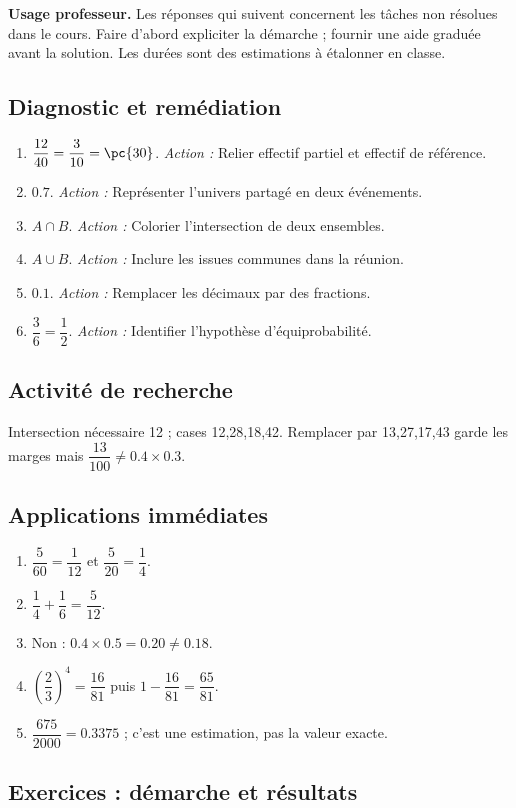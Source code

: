 \label{C05-CORR}
\textbf{Usage professeur.} Les réponses qui suivent concernent les tâches non résolues dans le cours. Faire d’abord expliciter la démarche ; fournir une aide graduée avant la solution. Les durées sont des estimations à étalonner en classe.
\subsection*{Diagnostic et remédiation}
\begin{enumerate}
\item $\dfrac{12}{40}=\dfrac{3}{10}=\pc{30}$. \textit{Action :} Relier effectif partiel et effectif de référence.
\item $\num{0,7}$. \textit{Action :} Représenter l’univers partagé en deux événements.
\item $A\cap B$. \textit{Action :} Colorier l’intersection de deux ensembles.
\item $A\cup B$. \textit{Action :} Inclure les issues communes dans la réunion.
\item $\num{0,1}$. \textit{Action :} Remplacer les décimaux par des fractions.
\item $\dfrac{3}{6}=\dfrac{1}{2}$. \textit{Action :} Identifier l’hypothèse d’équiprobabilité.
\end{enumerate}
\subsection*{Activité de recherche}
Intersection nécessaire 12 ; cases 12,28,18,42. Remplacer par 13,27,17,43 garde les marges mais $\dfrac{13}{100}\ne \num{0,4}\times \num{0,3}$.
\subsection*{Applications immédiates}
\begin{enumerate}
\item $\dfrac{5}{60}=\dfrac{1}{12}$ et $\dfrac{5}{20}=\dfrac{1}{4}$.
\item $\dfrac{1}{4}+\dfrac{1}{6}=\dfrac{5}{12}$.
\item Non : $\num{0,4}\times\num{0,5}=\num{0,20}\ne\num{0,18}$.
\item $(\dfrac{2}{3})^4=\dfrac{16}{81}$ puis $1-\dfrac{16}{81}=\dfrac{65}{81}$.
\item $\dfrac{675}{2000}=\num{0,3375}$ ; c’est une estimation, pas la valeur exacte.
\end{enumerate}
\subsection*{Exercices : démarche et résultats}
